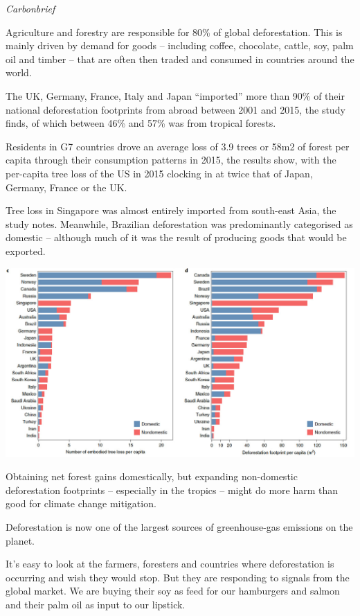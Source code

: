\documentclass[
]{book}
\begin{document}
\emph{Carbonbrief}

Agriculture and forestry are responsible for 80\% of global deforestation.
This is mainly driven by demand for goods --
including coffee, chocolate, cattle, soy, palm oil and timber --
that are often then traded and consumed in countries around the world.

The UK, Germany, France, Italy and Japan ``imported'' more than
90\% of their national deforestation footprints from abroad between 2001 and 2015,
the study finds, of which between 46\% and 57\% was from tropical forests.

Residents in G7 countries drove an average loss of 3.9 trees or 58m2 of forest per capita through their consumption patterns in 2015, the results show, with the per-capita tree loss of the US in 2015 clocking in at twice that of Japan, Germany, France or the UK.

Tree loss in Singapore was almost entirely imported from south-east Asia, the study notes. Meanwhile, Brazilian deforestation was predominantly categorised as domestic -- although much of it was the result of producing goods that would be exported.

\includegraphics{fig/deforestaion_footprint.jpg}

Obtaining net forest gains domestically,
but expanding non-domestic deforestation footprints --
especially in the tropics -- might do more harm than good for climate change mitigation.

Deforestation is now one of the largest sources of greenhouse-gas emissions on the planet.

It's easy to look at the farmers, foresters and countries where deforestation is occurring and wish they would stop. But they are responding to signals from the global market. We are buying their soy as feed for our hamburgers and salmon and their palm oil as input to our lipstick.
\end{document}
